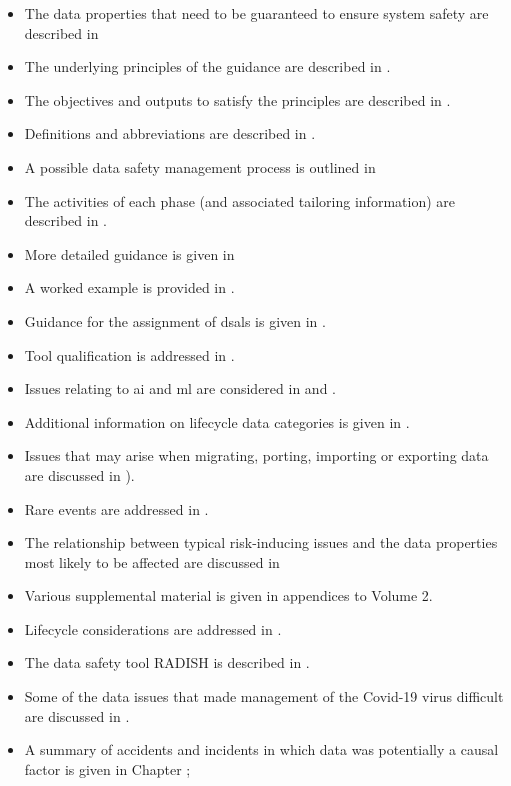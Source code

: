 \begin{itemize}
	\item The data properties that need to be guaranteed to ensure system safety are described in 
	\item The underlying principles of the guidance are described in .
	\item The objectives and outputs to satisfy the principles are described in .
	\item Definitions and abbreviations are described in .
	\item A possible data safety management process is outlined in 
	\item The activities of each phase (and associated \gls{tailoring} \gls{information}) are described in .
	\item More detailed guidance is given in 
	\item A worked example is provided in .
	\item Guidance for the assignment of \glspl{dsal} is given in .
	\item Tool qualification is addressed in .
	\item Issues relating to \gls{ai} and \gls{ml} are considered in  and .
	\item Additional information on lifecycle data categories is given in .
	\item Issues that may arise when migrating, porting, importing or exporting data are discussed in ).
	\item Rare events are addressed in .
	\item The relationship between typical risk-inducing issues and the data properties most likely to be affected are discussed in 
	\item Various supplemental material is given in appendices to Volume 2.
	\item Lifecycle considerations are addressed in .
	\item The data safety tool RADISH is described in .
	\item Some of the data issues that made management of the Covid-19 virus difficult are discussed in .
	\item A summary of accidents and incidents in which data was potentially a causal factor is given in Chapter ;
\end{itemize}

